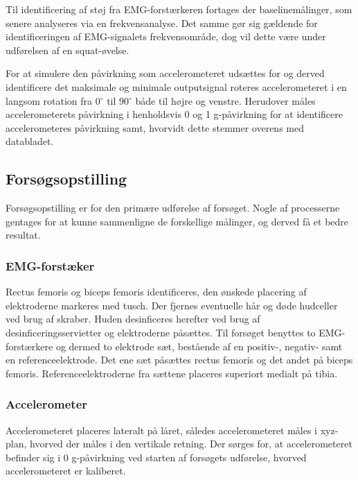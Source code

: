 Til identificering af støj fra EMG-forstærkeren fortages der baselinemålinger, som senere analyseres via en frekvensanalyse. Det samme gør sig gældende for identificeringen af EMG-signalets frekvensområde, dog vil dette være under udførelsen af en squat-øvelse.  


For at simulere den påvirkning som accelerometeret udsættes for og derved identificere det maksimale og minimale outputsignal roteres accelerometeret i en langsom rotation fra 0$^{\circ}$ til 90$^{\circ}$ både til højre og venstre. Herudover måles accelerometerets påvirkning i henholdsvis 0 og 1 g-påvirkning for at identificere accelerometeres påvirkning samt, hvorvidt dette stemmer overens med databladet. 

\subsection{Forsøgsopstilling}
Forsøgsopstilling er for den primære udførelse af forsøget. Nogle af processerne gentages for at kunne sammenligne de forskellige målinger, og derved få et bedre resultat.

\subsubsection{EMG-forstæker}
Rectus femoris og biceps femoris identificeres, den ønskede placering af elektroderne markeres med tusch. Der fjernes eventuelle hår og døde hudceller ved brug af skraber. Huden desinficeres herefter ved brug af desinficeringsservietter og elektroderne påsættes. 
Til forsøget benyttes to EMG-forstærkere og dermed to elektrode sæt, bestående af en positiv-, negativ- samt en referenceelektrode. Det ene sæt påsættes rectus femoris og det andet på biceps femoris. Referenceelektroderne fra sættene placeres superiort medialt på tibia. 

\subsubsection{Accelerometer}
Accelerometeret placeres lateralt på låret, således accelerometeret måles i xyz-plan, hvorved der måles i den vertikale retning. Der sørges for, at accelerometeret befinder sig i 0 g-påvirkning ved starten af forsøgets udførelse, hvorved accelerometeret er kaliberet. 

